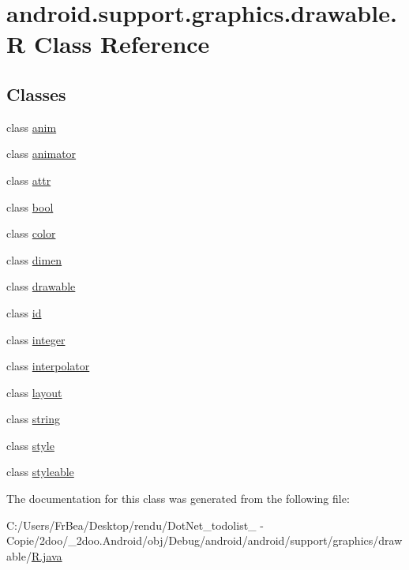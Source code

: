 \hypertarget{classandroid_1_1support_1_1graphics_1_1drawable_1_1_r}{
\section{android.support.graphics.drawable.R Class Reference}
\label{classandroid_1_1support_1_1graphics_1_1drawable_1_1_r}
}
\subsection*{Classes}
\begin{CompactItemize}
\item 
class \hyperlink{classandroid_1_1support_1_1graphics_1_1drawable_1_1_r_1_1anim}{anim}
\item 
class \hyperlink{classandroid_1_1support_1_1graphics_1_1drawable_1_1_r_1_1animator}{animator}
\item 
class \hyperlink{classandroid_1_1support_1_1graphics_1_1drawable_1_1_r_1_1attr}{attr}
\item 
class \hyperlink{classandroid_1_1support_1_1graphics_1_1drawable_1_1_r_1_1bool}{bool}
\item 
class \hyperlink{classandroid_1_1support_1_1graphics_1_1drawable_1_1_r_1_1color}{color}
\item 
class \hyperlink{classandroid_1_1support_1_1graphics_1_1drawable_1_1_r_1_1dimen}{dimen}
\item 
class \hyperlink{classandroid_1_1support_1_1graphics_1_1drawable_1_1_r_1_1drawable}{drawable}
\item 
class \hyperlink{classandroid_1_1support_1_1graphics_1_1drawable_1_1_r_1_1id}{id}
\item 
class \hyperlink{classandroid_1_1support_1_1graphics_1_1drawable_1_1_r_1_1integer}{integer}
\item 
class \hyperlink{classandroid_1_1support_1_1graphics_1_1drawable_1_1_r_1_1interpolator}{interpolator}
\item 
class \hyperlink{classandroid_1_1support_1_1graphics_1_1drawable_1_1_r_1_1layout}{layout}
\item 
class \hyperlink{classandroid_1_1support_1_1graphics_1_1drawable_1_1_r_1_1string}{string}
\item 
class \hyperlink{classandroid_1_1support_1_1graphics_1_1drawable_1_1_r_1_1style}{style}
\item 
class \hyperlink{classandroid_1_1support_1_1graphics_1_1drawable_1_1_r_1_1styleable}{styleable}
\end{CompactItemize}


The documentation for this class was generated from the following file:\begin{CompactItemize}
\item 
C:/Users/FrBea/Desktop/rendu/DotNet\_\-todolist\_ - Copie/2doo/\_\-2doo.Android/obj/Debug/android/android/support/graphics/drawable/\hyperlink{android_2support_2graphics_2drawable_2_r_8java}{R.java}\end{CompactItemize}
